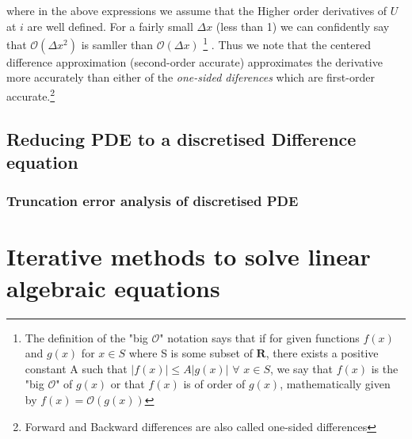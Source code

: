 \documentclass[a4paper,12pt]{article}
\numberwithin{equation}{section}
\newcommand{\mcm}[1]{\mathcal{#1}}
\newcommand{\bo}{\mcm{O}}
\begin{document}
where in the above expressions we assume that the Higher order derivatives of $U$ at $i$ are well defined. For a fairly small $\Delta x$ (less than 1) we can confidently say that $\bo(\Delta x^2)$ is samller than $\bo(\Delta x)$%
\footnote{The definition of the "big $\bo$" notation says that if for given functions $f(x)$ and $g(x)$ for $x \in S$ where S is some subset of $\mathbf{R}$, there exists a positive constant A such that $|f(x)| \leq A|g(x)|$ $\forall$ $x \in S$, we say that $f(x)$ is the "big $\bo$" of $g(x)$ or that $f(x)$ is of order of $g(x)$, mathematically given by $f(x) = \bo(g(x))$}%
. Thus we note that the centered difference approximation (second-order accurate) approximates the derivative more accurately than either of the \textit{one-sided diferences} which are first-order accurate.\footnote{Forward and Backward differences are also called one-sided differences}

\subsection{Reducing PDE to a discretised Difference equation}
\subsubsection{Truncation error analysis of discretised PDE}


\section{Iterative methods to solve linear algebraic equations}
\end{document}
